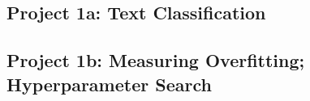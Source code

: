 \documentclass[12pt]{article}
\begin{document}
      \subsubsection*{}
      \subsubsection*{}
      \subsubsection*{}
    \newpage

    \subsection*{Project 1a: Text Classification} %
      \subsubsection*{}
      \subsubsection*{}
      \subsubsection*{}
      \subsubsection*{}
      \subsubsection*{}
    \newpage

    \subsection*{Project 1b: Measuring Overfitting; Hyperparameter Search}
      \subsubsection*{}
      \subsubsection*{}
      \subsubsection*{}
\end{document}
